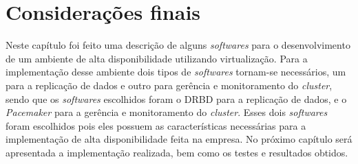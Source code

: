 

\section{Considerações finais}

Neste capítulo foi feito uma descrição de alguns \textit{softwares} para o desenvolvimento de um ambiente de alta disponibilidade utilizando 
virtualização. Para a implementação desse ambiente dois tipos de \textit{softwares} tornam-se necessários, um para a replicação de dados e outro 
para gerência e monitoramento do \textit{cluster}, sendo que os \textit{softwares} escolhidos foram o \ac{DRBD} para a replicação de dados, 
e o \textit{Pacemaker} para a gerência e monitoramento do \textit{cluster}. Esses dois \textit{softwares} foram escolhidos pois eles possuem 
as características necessárias para a implementação de alta disponibilidade feita na empresa. 
No próximo capítulo será apresentada a implementação realizada, bem como os testes e resultados obtidos.
